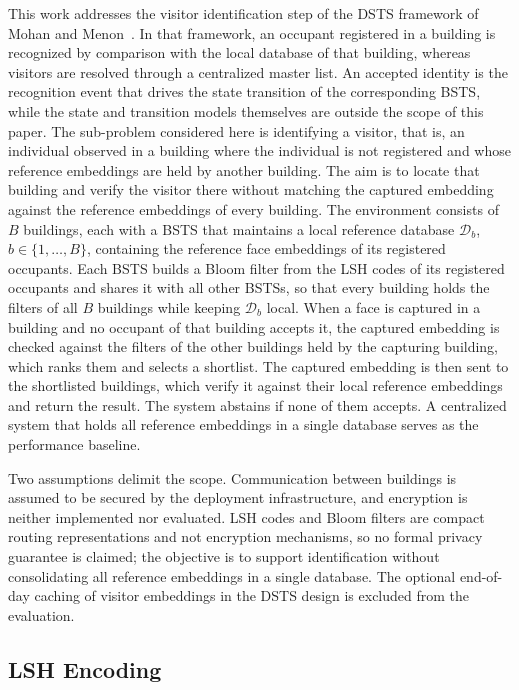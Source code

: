 \documentclass[pdflatex,sn-mathphys-num]{sn-jnl}%
\theoremstyle{thmstyleone}%
\theoremstyle{thmstyletwo}%
\theoremstyle{thmstylethree}%
\begin{document}
This work addresses the visitor identification step of the DSTS framework of Mohan and Menon~\cite{mohan2020}. In that framework, an occupant registered in a building is recognized by comparison with the local database of that building, whereas visitors are resolved through a centralized master list. An accepted identity is the recognition event that drives the state transition of the corresponding BSTS, while the state and transition models themselves are outside the scope of this paper. The sub-problem considered here is identifying a visitor, that is, an individual observed in a building where the individual is not registered and whose reference embeddings are held by another building. The aim is to locate that building and verify the visitor there without matching the captured embedding against the reference embeddings of every building. The environment consists of $B$ buildings, each with a BSTS that maintains a local reference database $\mathcal{D}_b$, $b\in\{1,\ldots,B\}$, containing the reference face embeddings of its registered occupants. Each BSTS builds a Bloom filter from the LSH codes of its registered occupants and shares it with all other BSTSs, so that every building holds the filters of all $B$ buildings while keeping $\mathcal{D}_b$ local. When a face is captured in a building and no occupant of that building accepts it, the captured embedding is checked against the filters of the other buildings held by the capturing building, which ranks them and selects a shortlist. The captured embedding is then sent to the shortlisted buildings, which verify it against their local reference embeddings and return the result. The system abstains if none of them accepts. A centralized system that holds all reference embeddings in a single database serves as the performance baseline.

Two assumptions delimit the scope. Communication between buildings is assumed to be secured by the deployment infrastructure, and encryption is neither implemented nor evaluated. LSH codes and Bloom filters are compact routing representations and not encryption mechanisms, so no formal privacy guarantee is claimed; the objective is to support identification without consolidating all reference embeddings in a single database. The optional end-of-day caching of visitor embeddings in the DSTS design is excluded from the evaluation.

\subsection{LSH Encoding}
\label{subsec:lsh_encoding}
\end{document}
